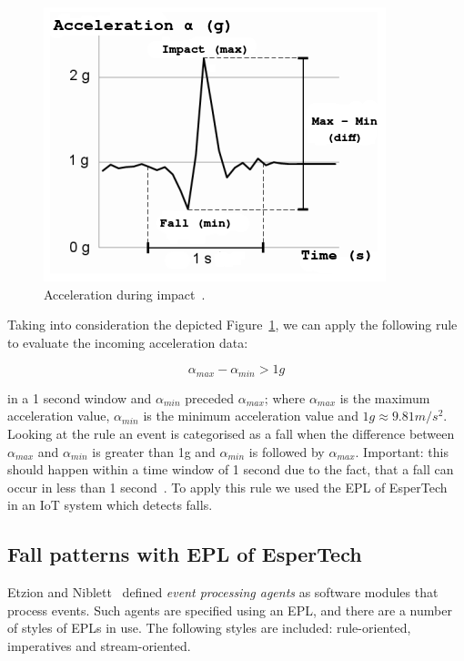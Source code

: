\documentclass[journal]{IEEEtran}
\begin{document}
\begin{figure}[!ht]
  \centering
  \includegraphics[scale=0.5]{img/FallGraph}
  \caption[Acceleration during impact]{Acceleration during impact~\cite{Kozina}.}
  \label{fig:grafica}
\end{figure}

Taking into consideration the depicted Figure~\ref{fig:grafica}, we can apply the following rule to evaluate the incoming acceleration data:

\begin{equation}\label{eq:caida}
 \alpha_{max} - \alpha_{min} > 1g
\end{equation}

in a 1 second window and $\alpha_{min}$ preceded $\alpha_{max}$; where $\alpha_{max}$ is the maximum acceleration value, 
$\alpha_{min}$ is the minimum acceleration value and $1g\approx9.81m/s^{2}$. Looking at the rule an event is categorised as a fall when the 
difference between $\alpha_{max}$ and $\alpha_{min}$ is greater than 1g and $\alpha_{min}$ is followed by $\alpha_{max}$. 
Important: this should happen within a time window of 1 second due to the fact, that a fall can occur in less than 1 second~\cite{Luder2009}.
To apply this rule we used the EPL of EsperTech~\cite{Esper:2016} in an IoT system which detects falls.

\subsection{Fall patterns with EPL of EsperTech}

Etzion and Niblett~\cite{Etz10} defined \textit{event processing agents} as software modules that process events. Such agents are specified using an 
EPL, and there are a number of styles of EPLs in use. The following styles are included: rule-oriented, imperatives and stream-oriented.
\end{document}
